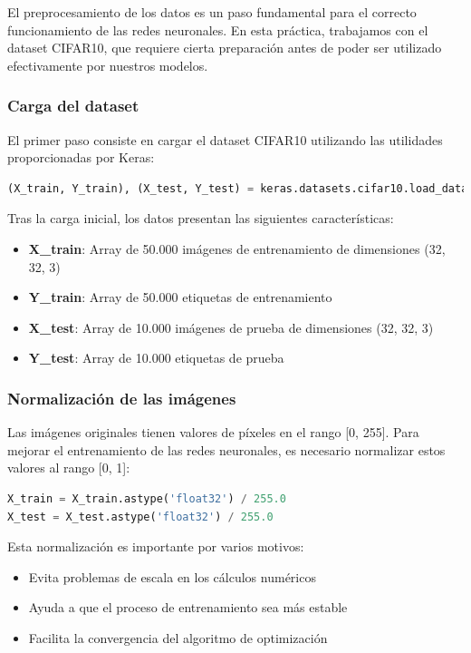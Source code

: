 \documentclass[11pt,a4paper]{article}
\begin{document}
El preprocesamiento de los datos es un paso fundamental para el correcto funcionamiento de las redes neuronales. En esta práctica, trabajamos con el dataset CIFAR10, que requiere cierta preparación antes de poder ser utilizado efectivamente por nuestros modelos.

\subsubsection{Carga del dataset}
El primer paso consiste en cargar el dataset CIFAR10 utilizando las utilidades proporcionadas por Keras:

\begin{lstlisting}[language=Python]
(X_train, Y_train), (X_test, Y_test) = keras.datasets.cifar10.load_data()
\end{lstlisting}

Tras la carga inicial, los datos presentan las siguientes características:
\begin{itemize}
    \item \textbf{X\_train}: Array de 50.000 imágenes de entrenamiento de dimensiones (32, 32, 3)
    \item \textbf{Y\_train}: Array de 50.000 etiquetas de entrenamiento
    \item \textbf{X\_test}: Array de 10.000 imágenes de prueba de dimensiones (32, 32, 3)
    \item \textbf{Y\_test}: Array de 10.000 etiquetas de prueba
\end{itemize}

\subsubsection{Normalización de las imágenes}
Las imágenes originales tienen valores de píxeles en el rango [0, 255]. Para mejorar el entrenamiento de las redes neuronales, es necesario normalizar estos valores al rango [0, 1]:

\begin{lstlisting}[language=Python]
X_train = X_train.astype('float32') / 255.0
X_test = X_test.astype('float32') / 255.0
\end{lstlisting}

Esta normalización es importante por varios motivos:
\begin{itemize}
    \item Evita problemas de escala en los cálculos numéricos
    \item Ayuda a que el proceso de entrenamiento sea más estable
    \item Facilita la convergencia del algoritmo de optimización
\end{itemize}
\end{document}

